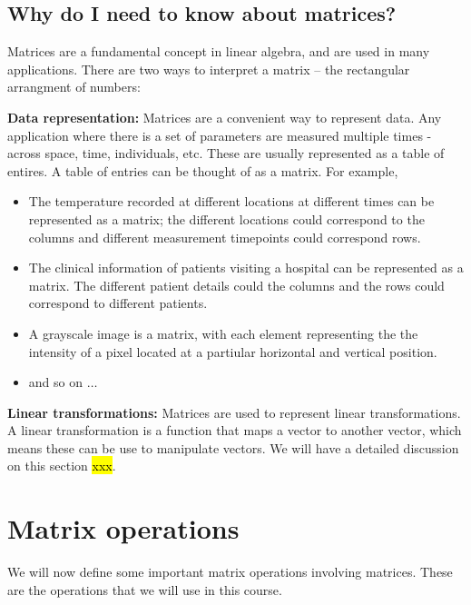 \subsection{Why do I need to know about matrices?}
Matrices are a fundamental concept in linear algebra, and are used in many applications. There are two ways to interpret a matrix -- the rectangular arrangment of numbers:

\vspace{0.2cm}
\noindent \textbf{Data representation:} Matrices are a convenient way to represent data. Any application where there is a set of parameters are measured multiple times - across space, time, individuals, etc. These are usually represented as a table of entires. A table of entries can be thought of as a matrix. For example, 
\begin{itemize}
    \item The temperature recorded at different locations at different times can be represented as a matrix; the different locations could correspond to the columns and different measurement timepoints could correspond rows.
    \item The clinical information of patients visiting a hospital can be represented as a matrix. The different patient details could the columns and the rows could correspond to different patients.
    \item A grayscale image is a matrix, with each element representing the the intensity of a pixel located at a partiular horizontal and vertical position.
    \item and so on $\ldots$
\end{itemize}

\vspace{0.2cm}
\noindent \textbf{Linear transformations:} Matrices are used to represent linear transformations. A linear transformation is a function that maps a vector to another vector, which means these can be use to manipulate vectors. We will have a detailed discussion on this section \hl{xxx}.

\section{Matrix operations}
We will now define some important matrix operations involving matrices. These are the operations that we will use in this course.

